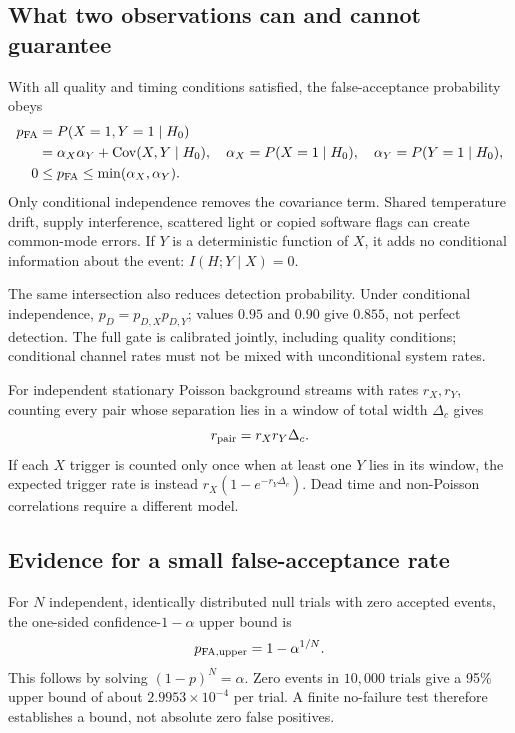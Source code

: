 \documentclass[10pt,a4paper]{article}
\numberwithin{equation}{section}
\begin{document}
\subsection*{What two observations can and cannot guarantee}
With all quality and timing conditions satisfied, the false-acceptance probability obeys
\begin{align}
p_{\rm FA}&=P(X=1,Y=1\mid H_0)\\
&=\alpha_X\alpha_Y+\operatorname{Cov}(X,Y\mid H_0),
\quad \alpha_X=P(X=1\mid H_0),\quad\alpha_Y=P(Y=1\mid H_0),\\
0&\le p_{\rm FA}\le\min(\alpha_X,\alpha_Y).
\end{align}
Only conditional independence removes the covariance term. Shared temperature drift, supply interference, scattered light or copied software flags can create common-mode errors. If $Y$ is a deterministic function of $X$, it adds no conditional information about the event: $I(H;Y\mid X)=0$.

The same intersection also reduces detection probability. Under conditional independence, $p_D=p_{D,X}p_{D,Y}$; values $0.95$ and $0.90$ give $0.855$, not perfect detection. The full gate is calibrated jointly, including quality conditions; conditional channel rates must not be mixed with unconditional system rates.

For independent stationary Poisson background streams with rates $r_X,r_Y$, counting every pair whose separation lies in a window of total width $\Delta_c$ gives
\begin{equation}
r_{\rm pair}=r_Xr_Y\Delta_c.
\end{equation}
If each $X$ trigger is counted only once when at least one $Y$ lies in its window, the expected trigger rate is instead $r_X(1-e^{-r_Y\Delta_c})$. Dead time and non-Poisson correlations require a different model.

\subsection*{Evidence for a small false-acceptance rate}
For $N$ independent, identically distributed null trials with zero accepted events, the one-sided confidence-$1-\alpha$ upper bound is
\begin{equation}
p_{\rm FA,upper}=1-\alpha^{1/N}.
\label{eq:zerofail}
\end{equation}
This follows by solving $(1-p)^N=\alpha$. Zero events in $10{,}000$ trials give a 95\% upper bound of about $2.9953\times10^{-4}$ per trial. A finite no-failure test therefore establishes a bound, not absolute zero false positives.
\end{document}
